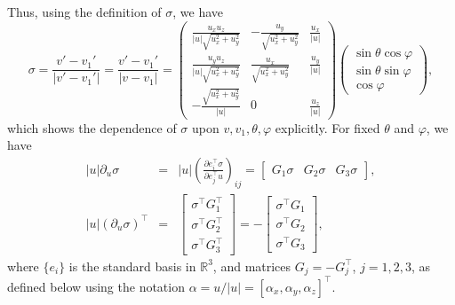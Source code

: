 \documentclass[12pt,nopreprintline]{elsarticle}
\newcommand{\bbR}{\mathbb R} \newcommand{\bbS}{\mathbb S}
\begin{document}
Thus, using the definition of $\sigma$, we have
\begin{equation}\label{eq:sigma}
    \sigma = \frac{v'- v_1'}{|v'-v_1'|} = \frac{v'- v_1'}{|v-v_1|} = \begin{pmatrix}
               \frac{u_x u_z}{|u|\sqrt{u_x^2 + u_y^2}} & -\frac{u_y }{\sqrt{u_x^2 + u_y^2}} &
               \frac{u_x}{|u|}\\
                \frac{u_y u_z}{|u| \sqrt{u_x^2 + u_y^2}} & \frac{u_x }{\sqrt{u_x^2 + u_y^2}} &
               \frac{u_y}{|u|}\\
               -\frac{\sqrt{u_x^2 + u_y^2}}{|u|} &
               0 &
               \frac{u_z}{|u|} 
               \end{pmatrix}
               \begin{pmatrix}
               \sin \theta \cos \varphi\\
               \sin \theta \sin \varphi\\
               \cos \varphi
               \end{pmatrix},
\end{equation}
which shows the dependence of $\sigma$ upon $v,v_1, \theta, \varphi$ explicitly. For fixed $\theta$ and $\varphi$, we have
\begin{eqnarray*}
    |u| \partial_u \sigma & = & |u| \left( \frac{\partial e_i^ \top \sigma }{\partial e_j^ \top u}\right)_{ij} = \begin{bmatrix} 
    G_1 \sigma &  G_2 \sigma &  G_3 \sigma
    \end{bmatrix}, \\
        |u|  \left( \partial_u \sigma \right)^\top &=&   \begin{bmatrix} 
   \sigma^\top G_1^\top \\  \sigma^\top G_2^\top  \\  \sigma^\top G_3^\top
    \end{bmatrix} = -  \begin{bmatrix}
       \sigma^\top G_1 \\  \sigma^\top G_2  \\  \sigma^\top G_3
    \end{bmatrix},
\end{eqnarray*}
where $\{e_i\}$ is the standard basis in $\bbR^3$, and matrices $G_j = -G_j^\top$, $j=1,2,3$, as defined below using the notation $\alpha = u/|u| = [\alpha_x, \alpha_y, \alpha_z]^\top$. 
\end{document}
